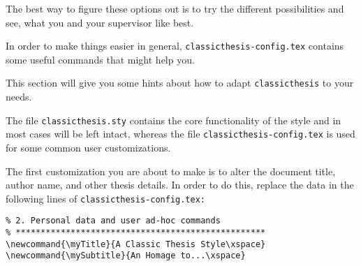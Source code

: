 \begin{itemize}
\begin{itemize}
		\end{itemize}    
 

   \end{itemize}
The best way to figure these options out is to try the different
possibilities and see, what you and your supervisor like best.

In order to make things easier in general, 
\texttt{classicthesis-config.tex} 
contains some useful commands that might help you.


This section will give you some hints about how to adapt 
\texttt{classicthesis} to your needs.

The file \texttt{classicthesis.sty}
contains the core functionality of the style and in most cases will
be left intact, whereas the file \texttt{classic\-thesis-config.tex}
is used for some common user customizations. 

The first customization you are about to make is to alter the document
title, author name, and other thesis details. In order to do this, replace
the data in the following lines of \texttt{classicthesis-config.tex:}%

\begin{lstlisting}[frame=lt]
% **************************************************
% 2. Personal data and user ad-hoc commands
% **************************************************
\newcommand{\myTitle}{A Classic Thesis Style\xspace} 
\newcommand{\mySubtitle}{An Homage to...\xspace} 
\end{lstlisting}

